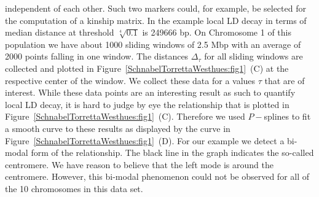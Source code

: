 \documentclass[twoside]{report}
\begin{document}
	independent of each other. Such two markers could, for example, be selected for the computation
	of a kinship matrix. In the example local 
		LD decay in terms of median distance at threshold $\sqrt[4]{0.1}$ is 249666 bp. 
	On Chromosome 1 of this population we have about 1000 sliding windows
	 of 2.5 Mbp with an 
	average of 2000 points falling in one window. The distances 
	$\Delta_{\tau}$ for all sliding windows are collected and plotted 
	in Figure~\ref{SchnabelTorrettaWesthues:fig1}~(C) 
	at the respective center of the window. We collect these data for a 
	values $\tau$ that are of interest. While these data points are an interesting result as
	such to quantify local LD decay, it is hard to judge by eye the relationship that is plotted in 
	Figure~\ref{SchnabelTorrettaWesthues:fig1}~(C). 
	Therefore we used $P-$splines to fit a smooth curve to these results as 
	displayed by the curve in Figure~\ref{SchnabelTorrettaWesthues:fig1}~(D). 
	For our example we detect a bi-modal form of the 
	relationship. The black line in the graph indicates the so-called centromere. 
	We have reason to believe that the left mode is around the centromere.   
	However, this bi-modal phenomenon could not be observed for 
	all of the 10 chromosomes in this data set.   
%
\end{document}
